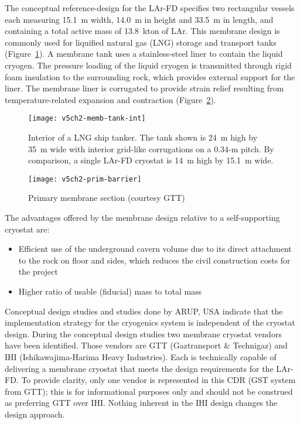 The conceptual reference-design  for the LAr-FD 
specifies two rectangular vessels each measuring 
15.1~m width, 14.0~m in height and 33.5~m in length,
and containing a total active mass of 13.8~kton of LAr. This membrane design is commonly used for liquified natural gas (LNG) 
storage and transport tanks (Figure~\ref{fig:memb-tank-int}). A membrane
tank uses a stainless-steel liner to contain the
liquid cryogen. The pressure loading of the liquid cryogen is transmitted through rigid foam insulation to the surrounding rock, which provides external support for the liner.  The membrane liner is corrugated to 
provide strain relief resulting from temperature-related expansion and contraction (Figure~\ref{fig:prim-barrier}).

\begin{figure}[htbp]
\centering
\texttt{[image: v5ch2-memb-tank-int]}
\caption[Interior of a LNG ship tanker]{Interior of a LNG ship tanker. %
The tank shown is 24~m high by 35~m wide with interior grid-like corrugations on a 0.34-m pitch.  By comparison, a  single LAr-FD cryostat is %
14~m high by 15.1~m wide.}
\label{fig:memb-tank-int}
\end{figure}

\begin{figure}[htbp]
\centering
\texttt{[image: v5ch2-prim-barrier]}
\caption[Primary membrane section]{Primary membrane section (courtesy GTT)}
\label{fig:prim-barrier}
\end{figure}

The advantages offered by the membrane design relative to a self-supporting cryostat are:
\begin{itemize}
\item Efficient use of the underground cavern volume due to its direct attachment to the rock on floor and sides,
which reduces the civil construction costs for the project
\item Higher ratio of usable (fiducial) mass to total mass
\end{itemize}

Conceptual design studies and studies done by ARUP, USA \cite{docdb4314} indicate that the implementation strategy for the cryogenics system is independent of the cryostat design. During the conceptual design studies two membrane cryostat vendors have been identified.  Those vendors are GTT (Gaztransport \& Technigaz) and IHI (Ishikawajima-Harima Heavy Industries).  Each is technically capable of delivering a membrane cryostat that meets the design requirements for the LAr-FD.  To provide clarity, only one vendor is represented in this CDR (GST system from GTT); this is for informational purposes only and should not be construed as preferring GTT over IHI.  Nothing inherent in the IHI design changes the design approach. 

